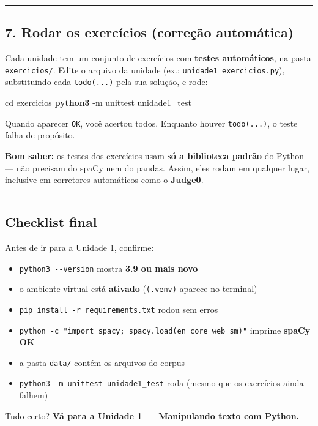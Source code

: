 \documentclass[
  brazilian,
  11pt,
]{article}
\newenvironment{Shaded}{\begin{snugshade}}{\end{snugshade}}
\newcommand{\AttributeTok}[1]{\textcolor[rgb]{0.16,0.50,0.73}{#1}}
\newcommand{\BuiltInTok}[1]{\textcolor[rgb]{0.50,0.55,0.55}{#1}}
\newcommand{\ExtensionTok}[1]{\textcolor[rgb]{0.00,0.60,1.00}{\textbf{#1}}}
\newcommand{\NormalTok}[1]{\textcolor[rgb]{0.81,0.81,0.76}{#1}}
\providecommand{\tightlist}{%
  \setlength{\itemsep}{0pt}\setlength{\parskip}{0pt}}
\let\oldtexttt\texttt
\renewcommand{\texttt}[1]{{\color{inlink}\oldtexttt{#1}}}
\begin{document}
\begin{center}\rule{0.5\linewidth}{0.5pt}\end{center}

\subsection{7. Rodar os exercícios (correção
automática)}\label{rodar-os-exercuxedcios-correuxe7uxe3o-automuxe1tica}

Cada unidade tem um conjunto de exercícios com \textbf{testes
automáticos}, na pasta \texttt{exercicios/}. Edite o arquivo da unidade
(ex.: \texttt{unidade1\_exercicios.py}), substituindo cada
\texttt{todo(...)} pela sua solução, e rode:

\begin{Shaded}
\begin{Highlighting}[]
\BuiltInTok{cd}\NormalTok{ exercicios}
\ExtensionTok{python3} \AttributeTok{{-}m}\NormalTok{ unittest unidade1\_test}
\end{Highlighting}
\end{Shaded}

Quando aparecer \texttt{OK}, você acertou todos. Enquanto houver
\texttt{todo(...)}, o teste falha de propósito.

\begin{tipbox}

\textbf{Bom saber:} os testes dos exercícios usam \textbf{só a
biblioteca padrão} do Python --- não precisam do spaCy nem do pandas.
Assim, eles rodam em qualquer lugar, inclusive em corretores automáticos
como o \textbf{Judge0}.

\end{tipbox}

\begin{center}\rule{0.5\linewidth}{0.5pt}\end{center}

\subsection{Checklist final}\label{checklist-final}

Antes de ir para a Unidade 1, confirme:

\begin{itemize}
\tightlist
\item[$\square$]
  \texttt{python3\ -\/-version} mostra \textbf{3.9 ou mais novo}
\item[$\square$]
  o ambiente virtual está \textbf{ativado} (\texttt{(.venv)} aparece no
  terminal)
\item[$\square$]
  \texttt{pip\ install\ -r\ requirements.txt} rodou sem erros
\item[$\square$]
  \texttt{python\ -c\ "import\ spacy;\ spacy.load(\textquotesingle{}en\_core\_web\_sm\textquotesingle{})"}
  imprime \textbf{spaCy OK}
\item[$\square$]
  a pasta \texttt{data/} contém os arquivos do corpus
\item[$\square$]
  \texttt{python3\ -m\ unittest\ unidade1\_test} roda (mesmo que os
  exercícios ainda falhem)
\end{itemize}

Tudo certo? \textbf{Vá para a
\href{../Unidade-1/unidade1_manipulando_texto.html}{Unidade 1 ---
Manipulando texto com Python}.}
\end{document}
